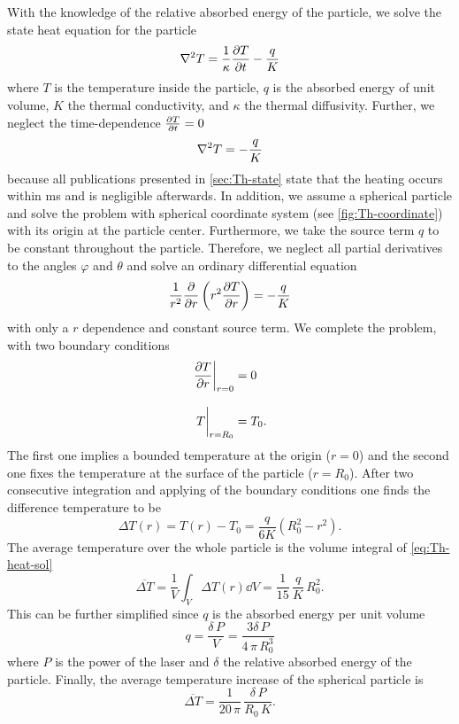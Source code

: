 With the knowledge of the relative absorbed energy of the particle, we solve 
the state heat equation for the particle
\begin{equation}
  \laplacian{T} = \frac{1}{\kappa} \pdv{T}{t} - \frac{q}{K}
  \label{eq:Th-heat-prob}
\end{equation}
where $T$ is the temperature inside the particle, $q$ is the absorbed energy of 
unit volume, $K$ the thermal conductivity, and $\kappa$ the thermal 
diffusivity. Further, we neglect the time-dependence $\pdv{T}{t}= 0$
\begin{equation}
  \laplacian{T} = - \frac{q}{K}
  \label{eq:Th-heat-stat}
\end{equation}
because all publications presented in \cref{sec:Th-state} state that the 
heating occurs within \si{\ms} and is negligible afterwards. In addition, we 
assume a spherical particle and solve the problem with spherical coordinate 
system (see \cref{fig:Th-coordinate}) with its origin at the particle center. 
Furthermore, we take the source term $q$ to be constant throughout the 
particle. Therefore, we neglect all partial derivatives to the angles $\varphi$ 
and $\theta$ and solve an ordinary differential equation
\begin{equation}
    \frac{1}{r^{2}}\pdv{r}\left( r^{2}\pdv{T}{r} \right) = - \frac{q}{K}
  \label{eq:Th-heat-spherical}
\end{equation}
with only a $r$ dependence and constant source term. We complete the problem, 
with two boundary conditions
\begin{subequations}
\begin{align}
  \eval{\pdv{T}{r}}_{r=0} &= 0\\[3mm]
  \eval{T}_{r=R_{0}} &= T_{0}.
\end{align}
\end{subequations}
The first one implies a bounded temperature at the origin ($r=0$) and the 
second one fixes the temperature at the surface of the particle ($r=R_{0}$).  
After two consecutive integration and applying of the boundary conditions one 
finds the difference temperature to be
\begin{equation}
  \Delta T(r) = T(r) - T_{0} = \frac{q}{6K}\left( R_0^2 - r^{2} \right).
  \label{eq:Th-heat-sol}
\end{equation}
The average temperature over the whole particle is the volume integral of 
\cref{eq:Th-heat-sol}
\begin{equation}
  \overline{\Delta T} = \frac{1}{V}\int_{V}\Delta T(r) \dd{V} = 
  \frac{1}{15}\,\frac{q}{K}\,R^{2}_{0}.
  \label{eq:Th-heat-avg}
\end{equation}
This can be further simplified since $q$ is the absorbed energy per unit volume
\begin{equation}
  q = \frac{\delta\,P}{V} = \frac{3\delta\,P}{4\,\pi\,R_{0}^{3}}
\end{equation}
where $P$ is the power of the laser and $\delta$ the relative absorbed energy 
of the particle. Finally, the average temperature increase of the spherical 
particle is
\begin{equation}
  \overline{\Delta T} = \frac{1}{20\,\pi}\,\frac{\delta\,P}{R_{0}\,K}.
  \label{eq:Th-heat-sol-simp}
\end{equation}


